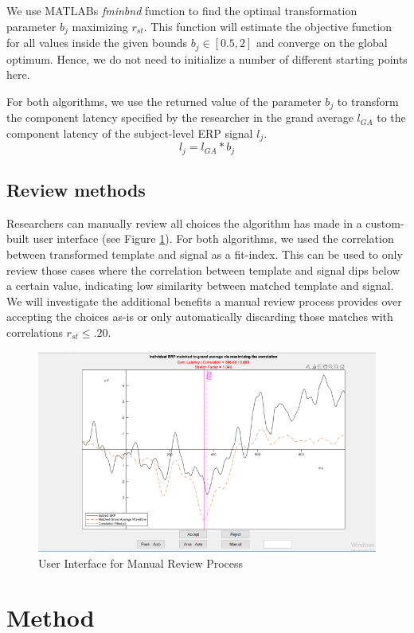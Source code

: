 \documentclass[
  man]{apa7}
\begin{document}
We use MATLABs \emph{fminbnd} function to find the optimal transformation parameter \(b_j\) maximizing \(r_{st}\). This function will estimate the objective function for all values inside the given bounds \(b_j \in [0.5, 2]\) and converge on the global optimum. Hence, we do not need to initialize a number of different starting points here.

For both algorithms, we use the returned value of the parameter \(b_j\) to transform the component latency specified by the researcher in the grand average \(l_{GA}\) to the component latency of the subject-level ERP signal \(l_j\).
\[ l_j = l_{GA} * b_j \]

\hypertarget{review-methods}{%
\subsection{Review methods}\label{review-methods}}

Researchers can manually review all choices the algorithm has made in a custom-built user interface (see Figure \ref{fig:review-gui-example}). For both algorithms, we used the correlation between transformed template and signal as a fit-index. This can be used to only review those cases where the correlation between template and signal dips below a certain value, indicating low similarity between matched template and signal. We will investigate the additional benefits a manual review process provides over accepting the choices as-is or only automatically discarding those matches with correlations \(r_{st} \le .20\).



\begin{figure}
\includegraphics[width=0.75\linewidth]{images/review_gui_example} \caption{User Interface for Manual Review Process}\label{fig:review-gui-example}
\end{figure}

\hypertarget{method}{%
\section{Method}\label{method}}
\end{document}
